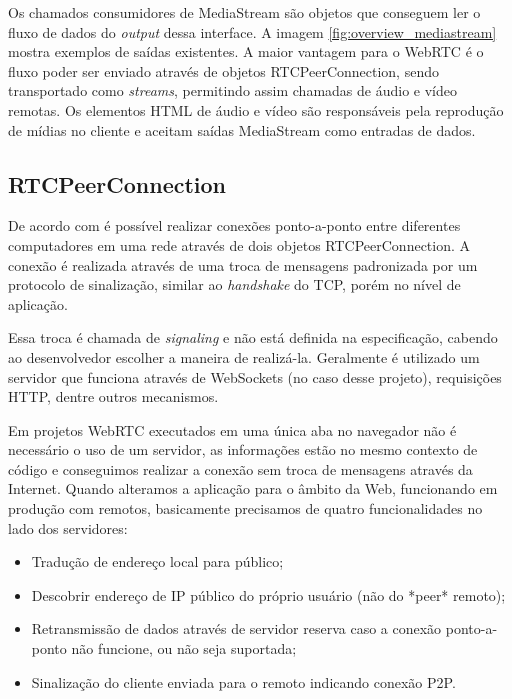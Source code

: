 Os chamados consumidores de MediaStream são objetos que conseguem ler o fluxo de dados do \textit{output} dessa interface. A imagem \ref{fig:overview_mediastream} mostra exemplos de saídas existentes. A maior vantagem para o WebRTC é o fluxo poder ser enviado através de objetos RTCPeerConnection, sendo transportado como \textit{streams}, permitindo assim chamadas de áudio e vídeo remotas. Os elementos HTML de áudio e vídeo são responsáveis pela reprodução de mídias no cliente e aceitam saídas MediaStream como entradas de dados.

\subsection{RTCPeerConnection}

De acordo com \cite[Sec.~4.1]{w3cwebrtc2017} é possível realizar conexões ponto-a-ponto entre diferentes computadores em uma rede através de dois objetos RTCPeerConnection. A conexão é realizada através de uma troca de mensagens padronizada por um protocolo de sinalização, similar ao \textit{handshake} do TCP, porém no nível de aplicação. 

Essa troca é chamada de \textit{signaling} e não está definida na especificação, cabendo ao desenvolvedor escolher a maneira de realizá-la. Geralmente é utilizado um servidor que funciona através de WebSockets (no caso desse projeto), requisições HTTP, dentre outros mecanismos.

Em projetos WebRTC executados em uma única aba no navegador não é necessário o uso de um servidor, as informações estão no mesmo contexto de código e conseguimos realizar a conexão sem troca de mensagens através da Internet. Quando alteramos a aplicação para o âmbito da Web, funcionando em produção com  remotos, basicamente precisamos de quatro funcionalidades no lado dos servidores:

\begin{itemize}
	\item Tradução de endereço local para público;
    \item Descobrir endereço de IP público do próprio usuário (não do *peer* remoto);
    \item Retransmissão de dados através de servidor reserva caso a conexão ponto-a-ponto não funcione, ou não seja suportada;
    \item Sinalização do cliente enviada para o remoto indicando conexão P2P.
\end{itemize}

